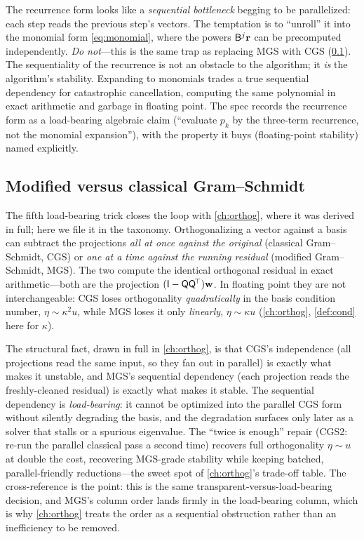 \begin{pitfall}
The recurrence form looks like a \emph{sequential bottleneck} begging to be
parallelized: each step reads the previous step's vectors. The temptation is to
``unroll'' it into the monomial form \eqref{eq:monomial}, where the powers
$\mathsf{B}^j\mathbf{r}$ can be precomputed independently. \emph{Do not}---this is the same
trap as replacing MGS with CGS (\cref{sec:orthog}). The sequentiality of the
recurrence is not an obstacle to the algorithm; it \emph{is} the algorithm's
stability. Expanding to monomials trades a true sequential dependency for
catastrophic cancellation, computing the same polynomial in exact arithmetic and
garbage in floating point. The spec records the recurrence form as a load-bearing
algebraic claim (``evaluate $p_k$ by the three-term recurrence, not the monomial
expansion''), with the property it buys (floating-point stability) named
explicitly.
\end{pitfall}

\subsection{Modified versus classical Gram--Schmidt}
\label{sec:orthog}

The fifth load-bearing trick closes the loop with \cref{ch:orthog}, where it was
derived in full; here we file it in the taxonomy. Orthogonalizing a vector against a
basis can subtract the projections \emph{all at once against the original}
(classical Gram--Schmidt, CGS) or \emph{one at a time against the running residual}
(modified Gram--Schmidt, MGS). The two compute the identical orthogonal residual in
exact arithmetic---both are the projection $(\mathsf{I} - \mathsf{Q}\mathsf{Q}^{\!\top})\mathbf{w}$.
In floating point they are not interchangeable: CGS loses orthogonality
\emph{quadratically} in the basis condition number, $\eta\sim\kappa^2 u$, while MGS
loses it only \emph{linearly}, $\eta\sim\kappa u$ (\cref{ch:orthog},
\cref{def:cond} here for $\kappa$).

The structural fact, drawn in full in \cref{ch:orthog}, is that CGS's independence
(all projections read the same input, so they fan out in parallel) is exactly what
makes it unstable, and MGS's sequential dependency (each projection reads the
freshly-cleaned residual) is exactly what makes it stable. The sequential dependency
is \emph{load-bearing}: it cannot be optimized into the parallel CGS form without
silently degrading the basis, and the degradation surfaces only later as a solver
that stalls or a spurious eigenvalue. The ``twice is enough'' repair (CGS2:
re-run the parallel classical pass a second time) recovers full orthogonality
$\eta\sim u$ at double the cost, recovering MGS-grade stability while keeping
batched, parallel-friendly reductions---the sweet spot of \cref{ch:orthog}'s
trade-off table. The cross-reference is the point: this is the same
transparent-versus-load-bearing decision, and MGS's column order lands firmly in the
load-bearing column, which is why \cref{ch:orthog} treats the order as a sequential
obstruction rather than an inefficiency to be removed.

